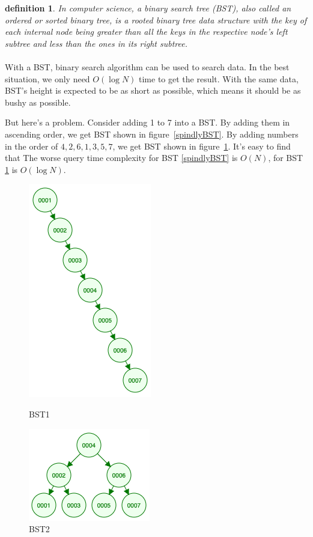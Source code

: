 \documentclass{article}
\newtheorem{definition}{definition}[section]
\begin{document}
\begin{definition}
    In computer science, a binary search tree (BST), also called an ordered or sorted binary tree, is a rooted binary tree data structure with the key of each internal node being greater than all the keys in the respective node's left subtree and less than the ones in its right subtree. 
\end{definition}

\paragraph{}
With a BST, binary search algorithm can be used to search data. In the best situation, we only need $O(\log{N})$ time to get the result. With the same data, BST's height is expected to be as short as possible, which means it should be as bushy as possible.

But here's a problem. Consider adding 1 to 7 into a BST. By adding them in ascending order, we get BST shown in figure~\ref{spindlyBST}. By adding numbers in the order of $4,2,6,1,3,5,7$, we get BST shown in figure~\ref{bushyBST}. It's easy to find that The worse query time complexity for BST \ref{spindlyBST} is $O(N)$, for BST \ref{bushyBST} is $O(\log{N})$.

\begin{figure}[htbp]
    \centering

	\begin{minipage}{0.49\linewidth}
		\centering
		\includegraphics[height = 100 pt]{spindlyBST.png}
		\caption{BST1}
		\label{spindlyBST}
	\end{minipage}
	\begin{minipage}{0.49\linewidth}
		\centering
		\includegraphics[height = 100 pt]{bushyBST.png}
		\caption{BST2}
		\label{bushyBST}
	\end{minipage}

\end{figure}
\newpage
\end{document}
